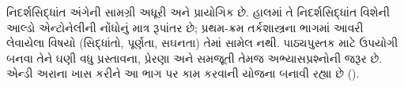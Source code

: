 \documentclass[../../include/open-logic-part]{subfiles}
\begin{document}

\begin{editorial}
  નિદર્શસિદ્ધાંત અંગેની સામગ્રી અધૂરી અને પ્રાયોગિક છે. હાલમાં તે
  નિદર્શસિદ્ધાંત વિશેની આલ્ડો એન્ટોનેલીની નોંધોનું માત્ર રૂપાંતર છે;
  પ્રથમ-ક્રમ તર્કશાસ્ત્રના ભાગમાં આવરી લેવાયેલા વિષયો (સિદ્ધાંતો,
  પૂર્ણતા, સઘનતા) તેમાં સામેલ નથી. પાઠ્યપુસ્તક માટે ઉપયોગી બનવા તેને
  ઘણી વધુ પ્રસ્તાવના, પ્રેરણા અને સમજૂતી તેમજ અભ્યાસપ્રશ્નોની જરૂર છે.
  એન્ડી અરાના ખાસ કરીને આ ભાગ પર કામ કરવાની યોજના બનાવી રહ્યા છે
  ().
\end{editorial}





\OLEndPartHook
\end{document}
